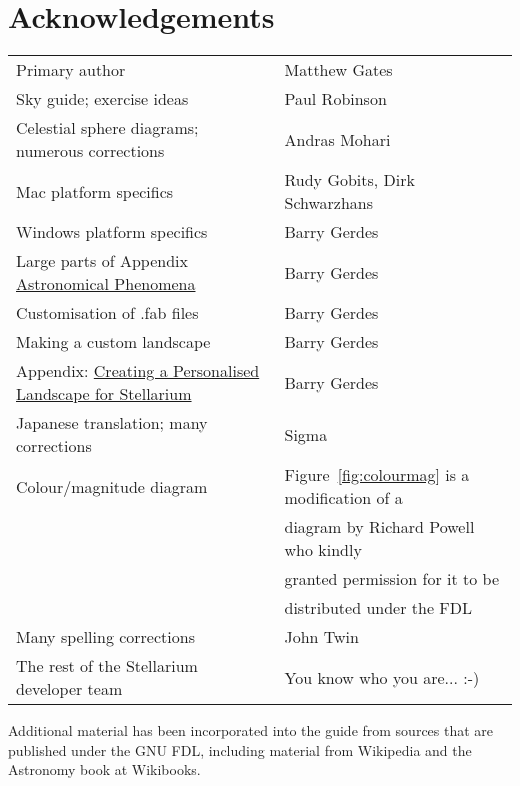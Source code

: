 
\chapter{Acknowledgements}

\begin{longtable}[c]{ll}
\toprule
Primary author & Matthew Gates \tabularnewline
Sky guide; exercise ideas & Paul Robinson\tabularnewline
Celestial sphere diagrams; numerous corrections & Andras Mohari\tabularnewline
Mac platform specifics & Rudy Gobits, Dirk Schwarzhans\tabularnewline
Windows platform specifics & Barry Gerdes\tabularnewline
Large parts of Appendix \href{Astronomical_Phenomena}{Astronomical Phenomena}& Barry Gerdes\tabularnewline
Customisation of .fab files& Barry Gerdes\tabularnewline 
Making a custom landscape & Barry Gerdes\tabularnewline
Appendix: \href{Creating_a_Personalised_Landscape_for_Stellarium}{Creating a Personalised Landscape for Stellarium} & Barry Gerdes\tabularnewline
Japanese translation; many corrections & Sigma\tabularnewline
Colour/magnitude diagram & Figure~\ref{fig:colourmag} is a modification of a \\
                          & diagram by Richard Powell who kindly \\
                          & granted permission for it to be \\
                          & distributed under the FDL\tabularnewline
Many spelling corrections & John Twin\tabularnewline
The rest of the Stellarium developer team & You know who you are... :-)\tabularnewline
\bottomrule
\end{longtable}

Additional material has been incorporated into the guide from sources
that are published under the GNU FDL, including material from Wikipedia
and the Astronomy book at Wikibooks.
